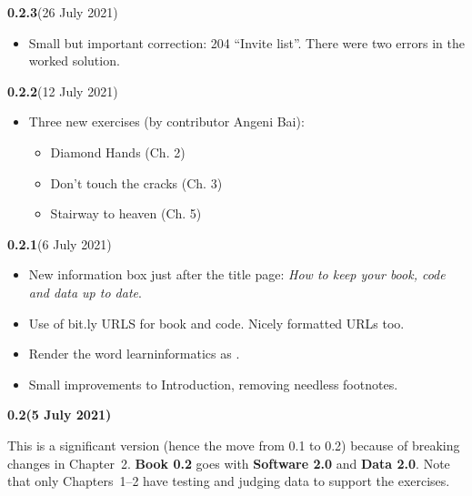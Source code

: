 

{
\small

\newcommand{\versionmarker}[2]{\textbf{#1}\quad(#2)}
\newcommand{\versionmarkerspecial}[2]{{\color{BrickRed}\bfseries#1\quad(#2)}}

\versionmarker{0.2.3}{26 July 2021}
\begin{itemize}
  \item Small but important correction: 204 ``Invite list''. There were two errors in the
    worked solution.
\end{itemize}

\versionmarker{0.2.2}{12 July 2021}
\begin{itemize}
  \item Three new exercises (by contributor Angeni Bai):
    \begin{itemize}
      \item Diamond Hands (Ch. 2)
      \item Don't touch the cracks (Ch. 3)
      \item Stairway to heaven (Ch. 5)
    \end{itemize}
\end{itemize}

\versionmarker{0.2.1}{6 July 2021}
\begin{itemize}
  \item New information box just after the title page: \emph{How to keep your book, code
    and data up to date}.
  \item Use of bit.ly URLS for book and code. Nicely formatted URLs too.
  \item Render the word learninformatics as \learninformatics{}.
  \item Small improvements to Introduction, removing needless footnotes.
\end{itemize}

\versionmarkerspecial{0.2}{5 July 2021}

This is a significant version (hence the move from 0.1 to 0.2) because of breaking changes
in Chapter~2. \textbf{Book 0.2} goes with \textbf{Software 2.0} and \textbf{Data 2.0}.
Note that only Chapters~1--2 have testing and judging data to support the exercises.

}
